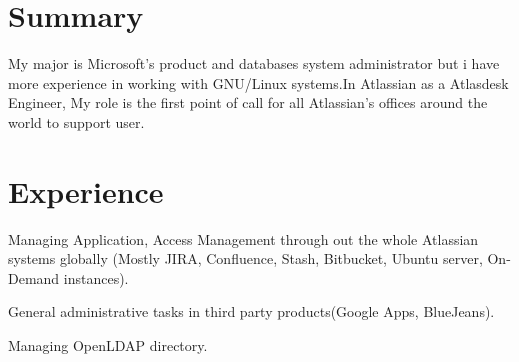 \documentclass[letterpaper]{deedy-resume} %
\begin{document}
\begin{minipage}[t]{0.33\textwidth}
\sectionspace %



\end{minipage} %
\hfill
%
%
\begin{minipage}[t]{0.66\textwidth} %
\section{Summary}
\vspace{\topsep} %
\begin{tightitemize}
\item My major is Microsoft’s product and databases system administrator but i have more experience in working with GNU/Linux systems.In Atlassian as a Atlasdesk Engineer, My role is the first point of call for all Atlassian’s offices around the world to support user.
\end{tightitemize}

\section{Experience}


\vspace{\topsep} %
\begin{tightitemize}
\item Managing Application, Access Management through out the whole Atlassian systems globally (Mostly JIRA, Confluence, Stash, Bitbucket, Ubuntu server, On-Demand instances).
\item General administrative tasks in third party products(Google Apps, BlueJeans).
\item Managing OpenLDAP directory.


\end{tightitemize}
\end{minipage}
\end{document}
